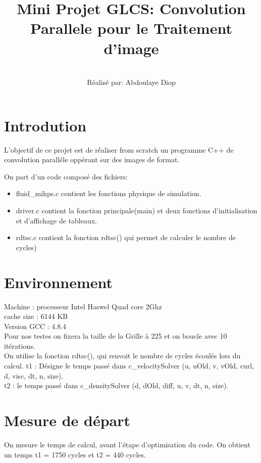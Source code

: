 \documentclass[a4paper, 10pt]{article}
\title{\textbf{Mini Projet GLCS: Convolution Parallele pour le Traitement d'image}}
\author{\\
R\'ealis\'e par: Abdoulaye Diop\\
}
\date{}
\begin{document}
\maketitle
\mbox{}
\cleardoublepage
\renewcommand{\contentsname}{Sommaire}
\tableofcontents

\cleardoublepage
\section{Introdution}
L'objectif de ce projet  est de r\'éaliser from scratch un programme C++ de convolution paralléle oppérant
 sur des images de format.



On part d'un code compos\'e des fichiers: 
\begin{itemize}
\item fluid\_mihps.c contient les fonctions physique de simulation.  
\item driver.c contient la fonction principale(main) et deux fonctions d'initialisation et d'affichage de tableaux.
\item rdtsc.c  contient la fonction rdtsc() qui permet de calculer le nombre de cycles)
\end{itemize}

\section{Environnement}
Machine : processeur Intel Haswel Quad core 2Ghz\\
		  cache size : 6144 KB \\	
		  Version GCC : 4.8.4\\
		  		
Pour nos testes on fixera la taille de la Grille \`a 225 et on boucle avec 10 it\'erations.\\
On  utilise la fonction rdtsc(), qui renvoit le nombre de cycles \'ecoul\'es lors du calcul.
t1 : D\'esigne le temps pass\'e dans c\_velocitySolver (u, uOld, v, vOld, curl, d, visc, dt, n, size).\\ 
t2 : le temps pass\'e dans  c\_densitySolver (d, dOld, diff, u, v, dt, n, size).

\section{Mesure de d\'epart}
On mesure le temps de calcul, avant l'\'etape d'optimisation du code. 
On obtient un temps t1 = 1750 cycles et t2 = 440 cycles.\\
\end{document}
